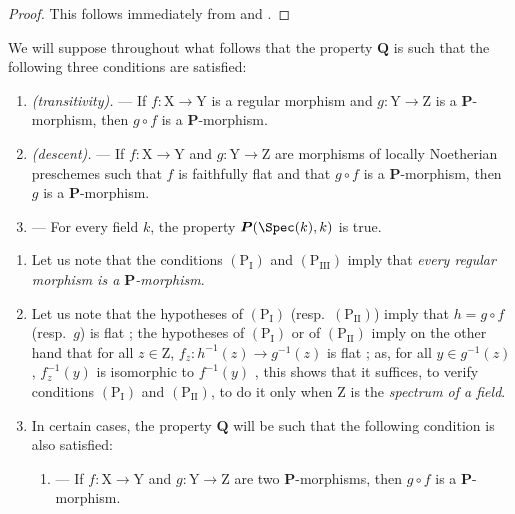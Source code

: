 \begin{proof}
This follows immediately from  and .
\end{proof}

\begin{env}[7.3.4]
\label{IV.7.3.4}
We will suppose throughout what follows that the property $\boldsymbol{Q}$ is such that the following three conditions are satisfied:
\begin{enumerate}
  \item[$(\mathrm{P_I})$] \emph{(transitivity).} ---
  If $f:\mathrm{X}\to\mathrm{Y}$ is a regular morphism  and $g:\mathrm{Y}\to\mathrm{Z}$ is a $\boldsymbol{P}$-morphism, then $g\circ f$ is a $\boldsymbol{P}$-morphism.
  \item[$(\mathrm{P_{II}})$] \emph{(descent).} ---
  If $f:\mathrm{X}\to\mathrm{Y}$ and $g:\mathrm{Y}\to\mathrm{Z}$ are morphisms of locally Noetherian preschemes such that $f$ is faithfully flat and that $g\circ f$ is a $\boldsymbol{P}$-morphism, then $g$ is a $\boldsymbol{P}$-morphism.
  \item[$(\mathrm{P_{III}})$] ---
  For every field $k$, the property $\boldsymbol{P}(\Spec(k),k)$ is true.
\end{enumerate}
\end{env}

\begin{remarks}[7.3.5]
\label{IV.7.3.5}
\begin{enumerate}[label=\emph{\roman*)}]
  \item Let us note that the conditions $(\mathrm{P_I})$ and $(\mathrm{P_{III}})$ imply that \emph{every regular morphism is a $\boldsymbol{P}$-morphism}.

  \item Let us note that the hypotheses of $(\mathrm{P_I})$ (resp.~$(\mathrm{P_{II}})$) imply that $h=g\circ f$ (resp.~$g$) is flat ; the hypotheses of $(\mathrm{P_I})$ or of $(\mathrm{P_{II}})$ imply on the other hand that for all $z\in\mathrm{Z}$, $f_z:h^{-1}(z)\to g^{-1}(z)$ is flat ; as, for all $y\in g^{-1}(z)$, $f_z^{-1}(y)$ is isomorphic to $f^{-1}(y)$ , this shows that it suffices, to verify conditions $(\mathrm{P_I})$ and $(\mathrm{P_{II}})$, to do it only when $\mathrm{Z}$ is the \emph{spectrum of a field}.

  \item In certain cases, the property $\boldsymbol{Q}$ will be such that the following condition is also satisfied:
  \begin{enumerate}
    \item[$(\mathrm{P'_I})$] ---
    If $f:\mathrm{X}\to\mathrm{Y}$ and $g:\mathrm{Y}\to\mathrm{Z}$ are two $\boldsymbol{P}$-morphisms, then $g\circ f$ is a $\boldsymbol{P}$-morphism.
  \end{enumerate}
\end{enumerate}
\end{remarks}

